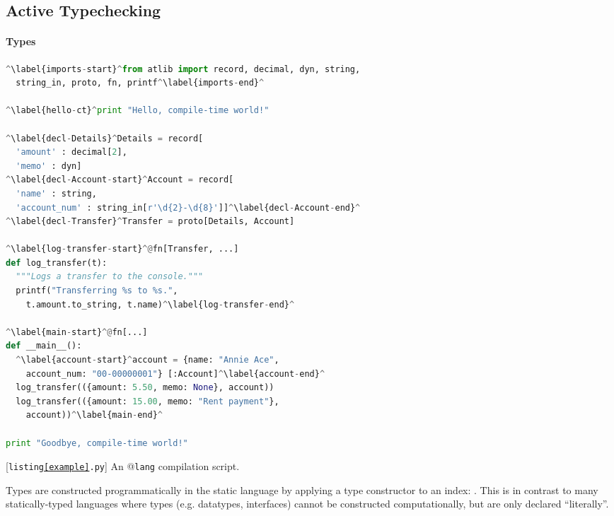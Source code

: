 \subsection{Active Typechecking} 

\paragraph{Types}
\begin{codelisting}[t]
\begin{lstlisting}[language=Python]
^\label{imports-start}^from atlib import record, decimal, dyn, string, 
  string_in, proto, fn, printf^\label{imports-end}^

^\label{hello-ct}^print "Hello, compile-time world!"

^\label{decl-Details}^Details = record[
  'amount' : decimal[2], 
  'memo' : dyn]
^\label{decl-Account-start}^Account = record[
  'name' : string, 
  'account_num' : string_in[r'\d{2}-\d{8}']]^\label{decl-Account-end}^
^\label{decl-Transfer}^Transfer = proto[Details, Account]

^\label{log-transfer-start}^@fn[Transfer, ...]
def log_transfer(t):
  """Logs a transfer to the console."""
  printf("Transferring %s to %s.", 
    t.amount.to_string, t.name)^\label{log-transfer-end}^

^\label{main-start}^@fn[...]
def __main__():
  ^\label{account-start}^account = {name: "Annie Ace", 
    account_num: "00-00000001"} [:Account]^\label{account-end}^
  log_transfer(({amount: 5.50, memo: None}, account))
  log_transfer(({amount: 15.00, memo: "Rent payment"}, 
    account))^\label{main-end}^
  
print "Goodbye, compile-time world!"
\end{lstlisting}
\caption{[\texttt{listing\ref{example}.py}] An @\texttt{lang} compilation script.}
\label{example}
\end{codelisting}
Types are constructed programmatically in the static language by applying a type constructor to an index:  . This is in contrast to many statically-typed languages where types (e.g. datatypes, interfaces) cannot be constructed computationally, but are only declared ``literally''. %
